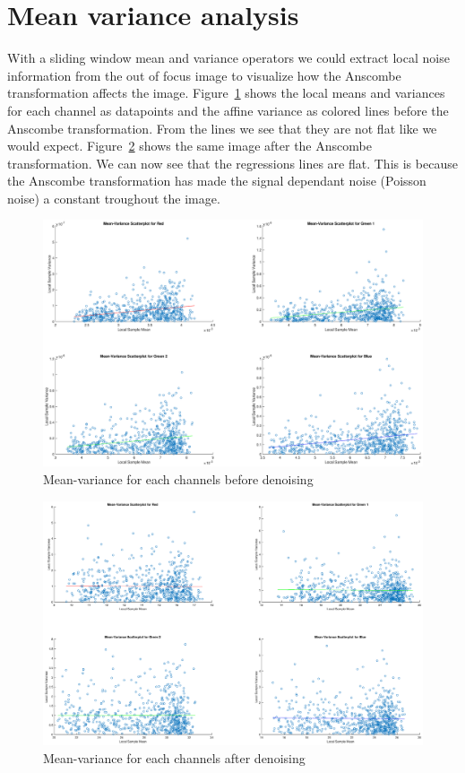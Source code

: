\documentclass[12pt,a4paper,english
]{tunithesis}
\begin{document}
\section{Mean variance analysis}
With a sliding window mean and variance operators we could extract local noise information from the out of focus image to visualize how the Anscombe transformation affects the image. Figure~\ref{fig:noisy-mean-variance} shows the local means and variances for each channel as datapoints and the affine variance as colored lines before the Anscombe transformation. From the lines we see that they are not flat like we would expect. Figure~\ref{fig:clean-mean-variance} shows the same image after the Anscombe transformation. We can now see that the regressions lines are flat. This is because the Anscombe transformation has made the signal dependant noise (Poisson noise) a constant troughout the image.

\begin{figure}
  \includegraphics[width=\textwidth]{img/noisy-mean-variance.eps}
  \caption{Mean-variance for each channels before denoising}
  \label{fig:noisy-mean-variance}
\end{figure}

\begin{figure}
  \includegraphics[width=\textwidth]{img/clean-mean-variance.eps}
  \caption{Mean-variance for each channels after denoising}
  \label{fig:clean-mean-variance}
\end{figure}
\end{document}
